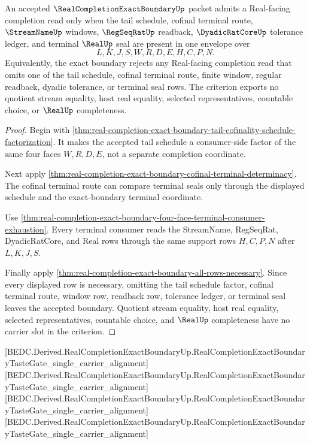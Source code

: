 \begin{theorem}
\label{thm:real-completion-exact-boundary-tail-envelope-criterion}
An accepted $\RealCompletionExactBoundaryUp$ packet admits a Real-facing completion read only when the tail schedule, cofinal terminal route, $\StreamNameUp$ windows, $\RegSeqRatUp$ readback, $\DyadicRatCoreUp$ tolerance ledger, and terminal $\RealUp$ seal are present in one envelope over
$$
L,K,J,S,W,R,D,E,H,C,P,N.
$$
Equivalently, the exact boundary rejects any Real-facing completion read that omits one of the tail schedule, cofinal terminal route, finite window, regular readback, dyadic tolerance, or terminal seal rows. The criterion exports no quotient stream equality, host real equality, selected representatives, countable choice, or $\RealUp$ completeness.
\end{theorem}
\begin{proof}
Begin with \autoref{thm:real-completion-exact-boundary-tail-cofinality-schedule-factorization}. It makes the accepted tail schedule a consumer-side factor of the same four faces $W,R,D,E$, not a separate completion coordinate.

Next apply \autoref{thm:real-completion-exact-boundary-cofinal-terminal-determinacy}. The cofinal terminal route can compare terminal seals only through the displayed schedule and the exact-boundary terminal coordinate.

Use \autoref{thm:real-completion-exact-boundary-four-face-terminal-consumer-exhaustion}. Every terminal consumer reads the StreamName, RegSeqRat, DyadicRatCore, and Real rows through the same support rows $H,C,P,N$ after $L,K,J,S$.

Finally apply \autoref{thm:real-completion-exact-boundary-all-rows-necessary}. Since every displayed row is necessary, omitting the tail schedule factor, cofinal terminal route, window row, readback row, tolerance ledger, or terminal seal leaves the accepted boundary. Quotient stream equality, host real equality, selected representatives, countable choice, and $\RealUp$ completeness have no carrier slot in the criterion.
\end{proof}

[BEDC.Derived.RealCompletionExactBoundaryUp.RealCompletionExactBoundaryTasteGate\_single\_carrier\_alignment]
[BEDC.Derived.RealCompletionExactBoundaryUp.RealCompletionExactBoundaryTasteGate\_single\_carrier\_alignment]
[BEDC.Derived.RealCompletionExactBoundaryUp.RealCompletionExactBoundaryTasteGate\_single\_carrier\_alignment]
[BEDC.Derived.RealCompletionExactBoundaryUp.RealCompletionExactBoundaryTasteGate\_single\_carrier\_alignment]

